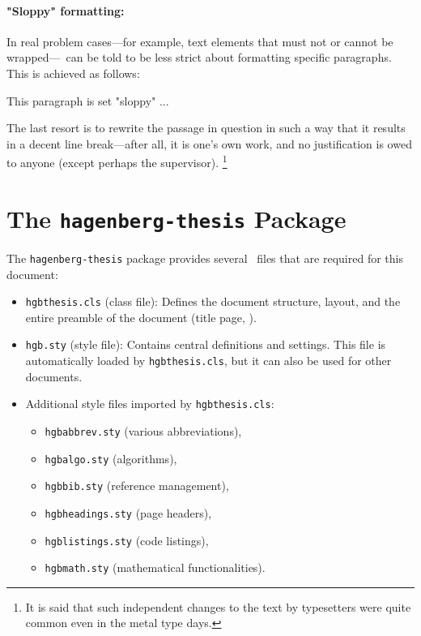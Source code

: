 \paragraph{"Sloppy" formatting:} In real problem cases---for example, text
elements that must not or cannot be wrapped---\latex\ can be told to be less
strict about formatting specific paragraphs. This is achieved as follows:
%
\begin{LaTeXCode}[numbers=none]
\begin{sloppypar}
    This paragraph is set "sloppy" ...
\end{sloppypar}
\end{LaTeXCode}
%
The last resort is to rewrite the passage in question in such a way that it
results in a decent line break---after all, it is one's own work, and no
justification is owed to anyone (except perhaps the supervisor).%
\footnote{It is said that such independent changes to the text by typesetters were
quite common even in the metal type days.}


\section{The \texttt{hagenberg-thesis} Package}

The \texttt{hagenberg-thesis} package provides several \latex\ files that are
required for this document:
%
\begin{itemize}
    \item \nolinkurl{hgbthesis.cls} (class file): Defines the document
    structure, layout, and the entire preamble of the document (title page,
    \etc).
    \item \nolinkurl{hgb.sty} (style file): Contains central definitions and
    settings. This file is automatically loaded by \nolinkurl{hgbthesis.cls},
    but it can also be used for other documents.
    \item Additional style files imported by \nolinkurl{hgbthesis.cls}:
    \begin{itemize}
        \item[] \nolinkurl{hgbabbrev.sty} (various abbreviations),
        \item[] \nolinkurl{hgbalgo.sty} (algorithms),
        \item[] \nolinkurl{hgbbib.sty} (reference management),
        \item[] \nolinkurl{hgbheadings.sty} (page headers),
        \item[] \nolinkurl{hgblistings.sty} (code listings),
        \item[] \nolinkurl{hgbmath.sty} (mathematical functionalities).
    \end{itemize}
\end{itemize}


